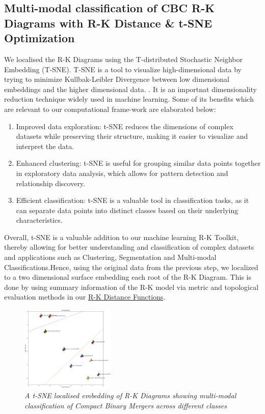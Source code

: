  \subsection{Multi-modal classification of CBC R-K Diagrams with R-K Distance \& t-SNE Optimization}

We localised the R-K Diagrams using the T-distributed Stochastic Neighbor Embedding (T-SNE). T-SNE is a tool to visualize high-dimensional data by trying to minimize Kullbak-Leibler Divergence between low dimensional embeddings and the higher dimensional data. \cite{sklearn.manifold.tsne_2014}. It is an importnat dimensionality reduction technique widely used in machine learning.\cite{25.0_tSNE1} Some of its benefits which are relevant to our computational frame-work are elaborated below:

\begin{enumerate}
    
 \item Improved data exploration: t-SNE reduces the dimensions of complex datasets while preserving their structure, making it easier to visualize and interpret the data.
 \item Enhanced clustering: t-SNE is useful for grouping similar data points together in exploratory data analysis, which allows for pattern detection and relationship discovery.
 \item Efficient classification: t-SNE is a valuable tool in classification tasks, as it can separate data points into distinct classes based on their underlying characteristics. \cite{25.1_tSNE2} \cite{25.2_linderman2019tSNE}

\end{enumerate}

Overall, t-SNE is a valuable addition to our machine learning R-K Toolkit, thereby allowing for better understanding and classification of complex datasets and applications such as Clustering, Segmentation and Multi-modal Classifications.\cite{25.3_tSNE2018analysis}Hence, using the original data from the previous step, we localized to a two dimensional surface embedding each root of the R-K Diagram. This is done by using summary information of the R-K model via metric and topological evaluation methods in our \hyperref[sec:rk_distance]{R-K Distance Functions}.

\begin{figure}[H]
 	\centering
        \includegraphics[width=0.4\textwidth]{images/ligo_multimodal_class_tsne.png}
	\caption{\textit{A t-SNE localised embedding of R-K Diagrams showing multi-modal classification of Compact Binary Mergers across different classes}}
	\label{fig:ligo_tsne}
\end{figure}

